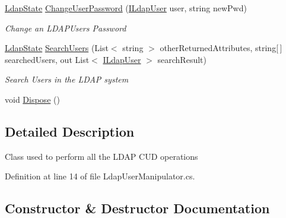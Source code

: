 \begin{DoxyCompactItemize}
\hyperlink{namespace_l_d_a_p_library_1_1_enums_a052eaa58cba3f62d4c008a3b1b347e03}{Ldap\+State} \hyperlink{class_l_d_a_p_library_1_1_ldap_user_manipulator_affe5f315a699bbc17f8a97a010281b80}{Change\+User\+Password} (\hyperlink{interface_l_d_a_p_library_1_1_interfarces_1_1_i_ldap_user}{I\+Ldap\+User} user, string new\+Pwd)
\begin{DoxyCompactList}\small\item\em Change an L\+D\+A\+P\+User\textquotesingle{}s Password \end{DoxyCompactList}\item 
\hyperlink{namespace_l_d_a_p_library_1_1_enums_a052eaa58cba3f62d4c008a3b1b347e03}{Ldap\+State} \hyperlink{class_l_d_a_p_library_1_1_ldap_user_manipulator_ab881e29e6737faaeaefbe999e5d7f3d7}{Search\+Users} (List$<$ string $>$ other\+Returned\+Attributes, string\mbox{[}$\,$\mbox{]} searched\+Users, out List$<$ \hyperlink{interface_l_d_a_p_library_1_1_interfarces_1_1_i_ldap_user}{I\+Ldap\+User} $>$ search\+Result)
\begin{DoxyCompactList}\small\item\em Search Users in the L\+D\+A\+P system \end{DoxyCompactList}\item 
void \hyperlink{class_l_d_a_p_library_1_1_ldap_user_manipulator_a684b2ed96a3f09d019000088fb9978c7}{Dispose} ()
\end{DoxyCompactItemize}


\subsection{Detailed Description}
Class used to perform all the L\+D\+A\+P C\+U\+D operations 



Definition at line 14 of file Ldap\+User\+Manipulator.\+cs.



\subsection{Constructor \& Destructor Documentation}
\hypertarget{class_l_d_a_p_library_1_1_ldap_user_manipulator_a274adcc84fad435c4570950874dce85a}{}
